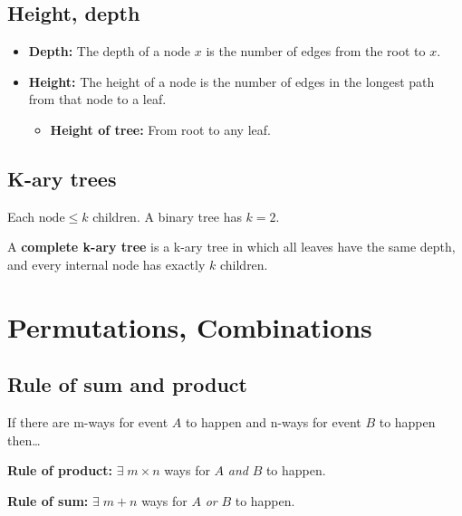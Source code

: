 \documentclass{article}
\begin{document}
\subsection{Height, depth}
\begin{definition}
    \begin{itemize}
        \item \textbf{Depth:} The depth of a node \( x \) is the number of edges from the root to \( x \).
        
        \item \textbf{Height:} The height of a node is the number of edges in the longest path from that node to a leaf.
        \begin{itemize}
            \item \textbf{Height of tree:} From root to any leaf.
        \end{itemize}
    \end{itemize}

\end{definition}

\subsection{K-ary trees}
\begin{definition}
        Each $\text{node} \leq k$ children. A binary tree has \( k = 2 \).
        \vspace{1em}

        A \textbf{complete k-ary tree} is a k-ary tree in which all leaves have the same depth, and every internal node has exactly \( k \) children. 
\end{definition}
\newpage

\section{Permutations, Combinations}
\subsection{Rule of sum and product}
    \begin{definition}
        If there are m-ways for event $A$ to happen and n-ways for event $B$ to happen then\dots
        \vspace{1em}

        \textbf{Rule of product:} $\exists \; m\times n$ ways for $A$ \emph{and} $B$ to happen. 
        \vspace{1em}

        \textbf{Rule of sum:} $\exists \; m + n$ ways for $A$ \emph{or} $B$ to happen. 
    \end{definition}
\end{document}
